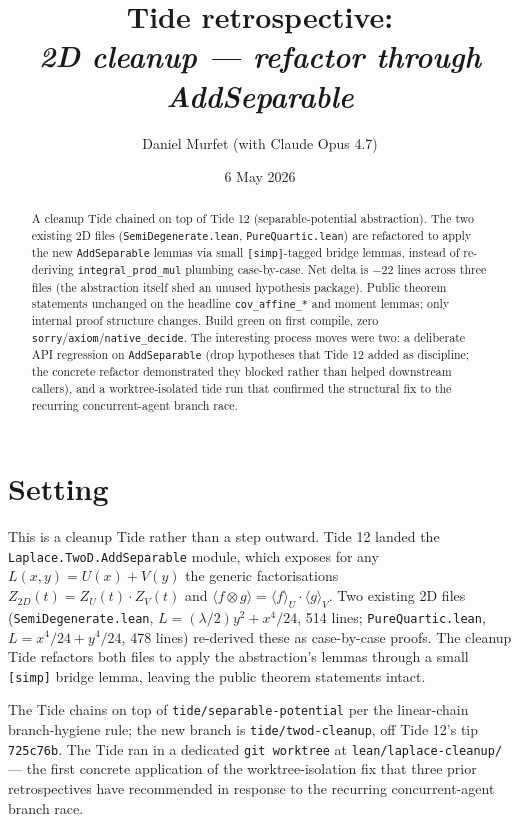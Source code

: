 \documentclass[11pt]{article}
\title{Tide retrospective:\\\emph{2D cleanup --- refactor through AddSeparable}}
\author{Daniel Murfet (with Claude Opus 4.7)}
\date{6 May 2026}
\begin{document}
\maketitle

\begin{abstract}
A cleanup Tide chained on top of Tide 12 (separable-potential
abstraction). The two existing 2D files
(\texttt{SemiDegenerate.lean}, \texttt{PureQuartic.lean}) are refactored
to apply the new \texttt{AddSeparable} lemmas via small
\texttt{[simp]}-tagged bridge lemmas, instead of re-deriving
\texttt{integral\_prod\_mul} plumbing case-by-case. Net delta is
$-22$ lines across three files (the abstraction itself shed an unused
hypothesis package). Public theorem statements unchanged on the
headline \texttt{cov\_affine\_*} and moment lemmas; only internal proof
structure changes. Build green on first compile, zero
\texttt{sorry}/\texttt{axiom}/\texttt{native\_decide}. The interesting
process moves were two: a deliberate API regression on
\texttt{AddSeparable} (drop hypotheses that Tide 12 added as
discipline; the concrete refactor demonstrated they blocked rather
than helped downstream callers), and a worktree-isolated tide run that
confirmed the structural fix to the recurring concurrent-agent branch
race.
\end{abstract}

\section{Setting}

This is a cleanup Tide rather than a step outward. Tide 12 landed the
\texttt{Laplace.TwoD.AddSeparable} module, which exposes for any
$L(x, y) = U(x) + V(y)$ the generic factorisations
$Z_{2D}(t) = Z_U(t) \cdot Z_V(t)$ and $\langle f \otimes g \rangle =
\langle f \rangle_U \cdot \langle g \rangle_V$. Two existing 2D files
(\texttt{SemiDegenerate.lean}, $L = (\lambda/2) y^2 + x^4/24$, 514
lines; \texttt{PureQuartic.lean}, $L = x^4/24 + y^4/24$, 478 lines)
re-derived these as case-by-case proofs. The cleanup Tide refactors
both files to apply the abstraction's lemmas through a small
\texttt{[simp]} bridge lemma, leaving the public theorem statements
intact.

The Tide chains on top of \texttt{tide/separable-potential} per the
linear-chain branch-hygiene rule; the new branch is
\texttt{tide/twod-cleanup}, off Tide 12's tip
\texttt{725c76b}. The Tide ran in a dedicated \texttt{git worktree} at
\texttt{lean/laplace-cleanup/} --- the first concrete application of
the worktree-isolation fix that three prior retrospectives have
recommended in response to the recurring concurrent-agent branch race.
\end{document}

